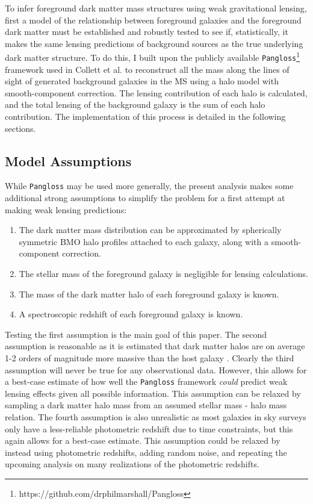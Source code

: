 \documentclass[%
 reprint,
 amsmath,amssymb,
 aps,nofootinbib
]{revtex4-1}
\begin{document}
To infer foreground dark matter mass structures using weak gravitational lensing, first a model of the relationship between foreground galaxies and the foreground dark matter must be established and robustly tested to see if, statistically, it makes the same lensing predictions of background sources as the true underlying dark matter structure. To do this, I built upon the publicly available \texttt{Pangloss}\footnote{\label{note1}https://github.com/drphilmarshall/Pangloss} framework used in Collett et al. \cite{collett_marshall} to reconstruct all the
mass along the lines of sight of generated background galaxies in the MS using a halo model with smooth-component correction. The lensing contribution of each halo is calculated, and the total lensing of the background galaxy is the sum of each halo contribution. The implementation of this process is detailed in the following sections.


\subsection{Model Assumptions} \label{assumptions}
While \texttt{Pangloss} may be used more generally, the present analysis makes some additional strong assumptions to simplify the problem for a first attempt at making weak lensing predictions:

\begin{enumerate}
\item The dark matter mass distribution can be approximated by spherically symmetric BMO halo profiles attached to each galaxy, along with a smooth-component correction.
\item The stellar mass of the foreground galaxy is negligible for lensing calculations.
\item The mass of the dark matter halo of each foreground galaxy is known.
\item A spectroscopic redshift of each foreground galaxy is known.
\end{enumerate}

Testing the first assumption is the main goal of this paper. The second assumption is reasonable as it is estimated that dark matter halos are on average 1-2 orders of magnitude more massive than the host galaxy \cite{smhr}. Clearly the third assumption will never be true for any observational data. However, this allows for a best-case estimate of how well the \texttt{Pangloss} framework \textit{could} predict weak lensing effects given all possible information. This assumption can be relaxed by sampling a dark matter halo mass from an assumed stellar mass - halo mass relation. The fourth assumption is also unrealistic as most galaxies in sky surveys only have a less-reliable photometric redshift due to time constraints, but this again allows for a best-case estimate. This assumption could be relaxed by instead using photometric redshifts, adding random noise, and repeating the upcoming analysis on many realizations of the photometric redshifts.
\end{document}
